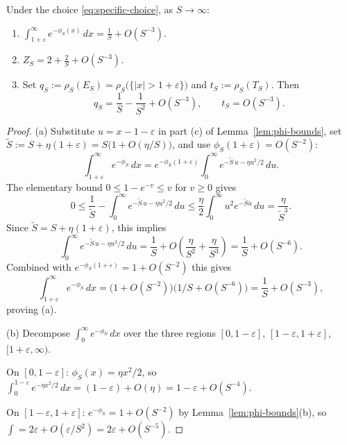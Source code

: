 \begin{lemma}\label{lem:normalization}
Under the choice \eqref{eq:specific-choice}, as $S\to\infty$:
\begin{enumerate}
\item[(a)] $\displaystyle\int_{1+\varepsilon}^{\infty}e^{-\phi_S(x)}\,dx
  =\frac{1}{S}+O(S^{-3})$.
\item[(b)] $\displaystyle Z_S = 2+\frac{2}{S}+O(S^{-3})$.
\item[(c)] Set
  $q_S:=\rho_S(E_S)=\rho_S\bigl(\{|x|>1+\varepsilon\}\bigr)$
  and $t_S:=\rho_S(T_S)$. Then
  \[
    q_S = \frac{1}{S}-\frac{1}{S^2}+O(S^{-3}),\qquad t_S=O(S^{-3}).
  \]
\end{enumerate}
\end{lemma}

\begin{proof}
(a) Substitute $u=x-1-\varepsilon$ in part (c) of
Lemma~\ref{lem:phi-bounds}, set $\widetilde S:=S+\eta(1+\varepsilon)=
S\bigl(1+O(\eta/S)\bigr)$, and use $\phi_S(1+\varepsilon)=O(S^{-2})$:
\[
  \int_{1+\varepsilon}^{\infty}e^{-\phi_S}\,dx
  = e^{-\phi_S(1+\varepsilon)}\int_0^{\infty}
     e^{-\widetilde S\,u-\eta u^2/2}\,du.
\]
The elementary bound $0\le 1-e^{-v}\le v$ for $v\ge0$ gives
\begin{equation}\label{eq:tail-expansion}
  0\le
  \frac{1}{\widetilde S}
  -\int_0^{\infty}e^{-\widetilde S\,u-\eta u^2/2}\,du
  \le
  \frac{\eta}{2}\int_0^\infty u^2e^{-\widetilde S u}\,du
  =\frac{\eta}{\widetilde S^3}.
\end{equation}
Since $\widetilde S=S+\eta(1+\varepsilon)$, this implies
\[
  \int_0^{\infty}e^{-\widetilde S\,u-\eta u^2/2}\,du
  =\frac{1}{S}+O\!\left(\frac{\eta}{S^2}+\frac{\eta}{S^3}\right)
  =\frac{1}{S}+O(S^{-6}).
\]
Combined with $e^{-\phi_S(1+\varepsilon)}=1+O(S^{-2})$ this gives
\[
  \int_{1+\varepsilon}^{\infty}e^{-\phi_S}\,dx
  =\bigl(1+O(S^{-2})\bigr)\bigl(1/S+O(S^{-6})\bigr)
  =\frac{1}{S}+O(S^{-3}),
\]
proving (a).

(b) Decompose $\int_0^{\infty}e^{-\phi_S}\,dx$ over the three regions
$[0,1-\varepsilon]$, $[1-\varepsilon,1+\varepsilon]$, $[1+\varepsilon,\infty)$.

On $[0,1-\varepsilon]$: $\phi_S(x)=\eta x^2/2$, so
$\int_0^{1-\varepsilon}e^{-\eta x^2/2}\,dx=(1-\varepsilon)+O(\eta)
=1-\varepsilon+O(S^{-4})$.

On $[1-\varepsilon,1+\varepsilon]$: $e^{-\phi_S}=1+O(S^{-2})$ by
Lemma~\ref{lem:phi-bounds}(b), so
$\int=2\varepsilon+O(\varepsilon/S^2)=2\varepsilon+O(S^{-5})$.


\end{proof}
